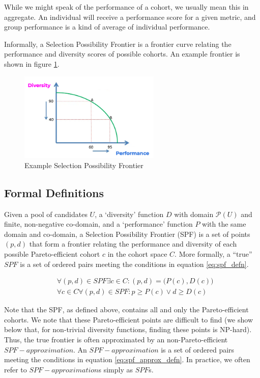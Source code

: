 While we might speak of the performance of a cohort, we usually mean this in aggregate. An individual will receive a performance score for a given metric, and group performance is a kind of average of individual performance.

Informally, a Selection Possibility Frontier is a frontier curve relating the performance and diversity scores of possible cohorts. An example frontier is shown in figure \ref{fig:example_spf}.

\begin{figure}[htb]
    \centering
    \includegraphics[width=0.6\textwidth]{figures/spf/example_spf.png}
    \caption{Example Selection Possibility Frontier}
    \label{fig:example_spf}
\end{figure}

\subsection{Formal Definitions}
Given a pool of candidates $U$, a `diversity' function $D$ with domain $\mathcal{P} (U)$ and finite, non-negative co-domain, and a `performance' function $P$ with the same domain and co-domain, a Selection Possibility Frontier (SPF) is a set of points $(p, d)$ that form a frontier relating the performance and diversity of each possible Pareto-efficient cohort $c$ in the cohort space $C$. More formally, a ``true'' $SPF$ is a set of ordered pairs meeting the conditions in equation \ref{eq:spf_defn}.

\begin{equation}
    \label{eq:spf_defn}
    \begin{split}
        &\forall (p, d) \in SPF \exists c \in C :(p, d) = \bigl( P(c), D(c) \bigr)  \\
        & \forall c \in C \forall (p, d) \in SPF :p \geq P(c) \lor d \geq D(c)
    \end{split}
\end{equation}

Note that the SPF, as defined above, contains all and only the Pareto-efficient cohorts. We note that these Pareto-efficient points are difficult to find (we show below that, for non-trivial diversity functions, finding these points is NP-hard). Thus, the true frontier is often approximated by an non-Pareto-efficient $SPF-approximation$. An $SPF-approximation$ is a set of ordered pairs meeting the conditions in equation \ref{eq:spf_approx_defn}. In practice, we often refer to $SPF-approximation$s simply as $SPF$s.

